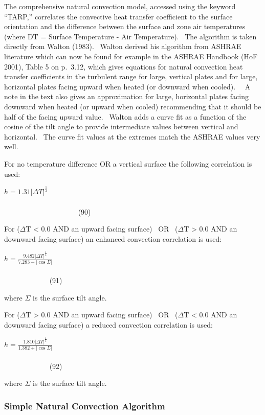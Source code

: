 The comprehensive natural convection model, accessed using the keyword ``TARP,'' correlates the convective heat transfer coefficient to the surface orientation and the difference between the surface and zone air temperatures (where DT = Surface Temperature - Air Temperature).~ The algorithm is taken directly from Walton (1983).~ Walton derived his algorithm from ASHRAE literature which can now be found for example in the ASHRAE Handbook (HoF 2001), Table 5 on p.~3.12, which gives equations for natural convection heat transfer coefficients in the turbulent range for large, vertical plates and for large, horizontal plates facing upward when heated (or downward when cooled).~~ A note in the text also gives an approximation for large, horizontal plates facing downward when heated (or upward when cooled) recommending that it should be half of the facing upward value.~ Walton adds a curve fit as a function of the cosine of the tilt angle to provide intermediate values between vertical and horizontal.~ The curve fit values at the extremes match the ASHRAE values very well.

For no temperature difference OR a vertical surface the following correlation is used:

\(h = 1.31{\left| {\Delta T} \right|^{\frac{1}{3}}}\) ~~~~~~~~~~~~~~~~~~~~~~~~~~~~~~~~~~~~~~~~~~~~~~~~~~~~~~~~~~~~~~~~~~~~~~~~~~~~~~~~~~~~~~~~~~~~ (90)

For ($\Delta$T \textless{} 0.0 AND an upward facing surface)~ OR~ ($\Delta$T \textgreater{} 0.0 AND an downward facing surface) an enhanced convection correlation is used:

\(h = \frac{{9.482{{\left| {\Delta T} \right|}^{\frac{1}{3}}}}}{{7.283 - \left| {\cos \Sigma } \right|}}\) ~~~~~~~~~~~~~~~~~~~~~~~~~~~~~~~~~~~~~~~~~~~~~~~~~~~~~~~~~~~~~~~~~~~~~~~~~~~~~~~~~~~~ (91)

where $\Sigma$ is the surface tilt angle.

For ($\Delta$T \textgreater{} 0.0 AND an upward facing surface)~ OR~ ($\Delta$T \textless{} 0.0 AND an downward facing surface) a reduced convection correlation is used:

\(h = \frac{{1.810{{\left| {\Delta T} \right|}^{\frac{1}{3}}}}}{{1.382 + \left| {\cos \Sigma } \right|}}\) ~~~~~~~~~~~~~~~~~~~~~~~~~~~~~~~~~~~~~~~~~~~~~~~~~~~~~~~~~~~~~~~~~~~~~~~~~~~~~~~~~~~~ (92)

where $\Sigma$ is the surface tilt angle.

\subsubsection{Simple Natural Convection Algorithm}\label{simple-natural-convection-algorithm}

